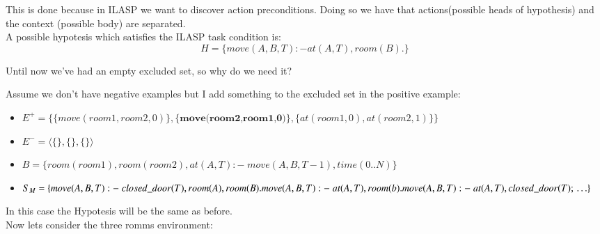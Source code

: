 This is done because in ILASP we want to discover action preconditions.
Doing so we have that actions(possible heads of hypothesis) and the context (possible body) are separated.\\

A possible hypotesis which satisfies the ILASP task condition is:
\begin{equation*}
    H = \{move(A,B,T) :- at(A,T), room(B).\}
\end{equation*}

Until now we've had an empty excluded set, so why do we need it?

Assume we don't have negative examples but I add something to the excluded set in the positive example:
\begin{itemize}
    \item $E^+ = \{\{move(room1,room2,0)\},\{\textbf{move(room2,room1,0)}\}, \{at(room1,0),at(room2,1)\}\}$
    \item $E^- = \langle\{\},\{\},\{\}\rangle$
    \item $B = \{room(room1), room(room2), at(A,T) :-\; move(A,B,T-1), time(0..N)\}$
    \item $S_{M}=\{\\
                move(A,B,T) :-\; closed\_door(T), room(A), room(B). \\
                move(A,B,T) :-\; at(A,T), room(b).\\
                move(A,B,T) :-\; at(A,T), closed\_door(T);\\
                \ldots\} \;$
\end{itemize}
In this case the Hypotesis will be the same as before.\\

Now lets consider the three romms environment:

